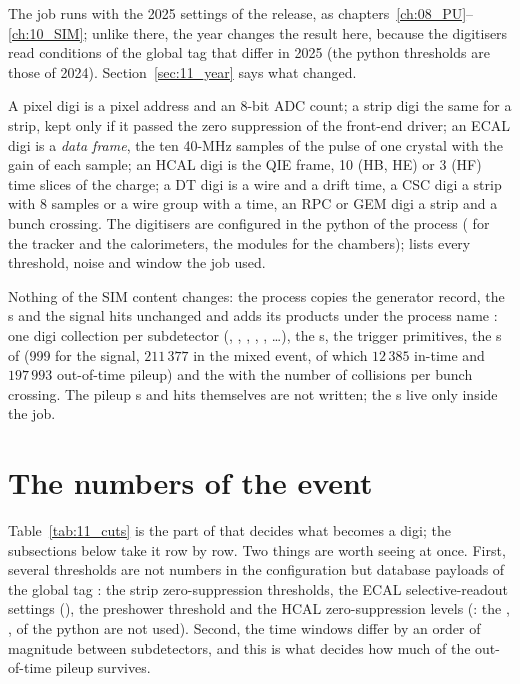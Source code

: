 The job runs with the 2025 settings of the release, as chapters~\ref{ch:08_PU}--\ref{ch:10_SIM}; unlike there, the
year changes the result here, because the digitisers read conditions of the global tag that differ in 2025 (the
python thresholds are those of 2024). Section~\ref{sec:11_year} says what changed.

\begin{plainwords}
A pixel digi is a pixel address and an 8-bit ADC count; a strip digi the same for a strip, kept only if it passed the
zero suppression of the front-end driver; an ECAL digi is a \emph{data frame}, the ten 40-MHz samples of the pulse of
one crystal with the gain of each sample; an HCAL digi is the QIE frame, 10 (HB, HE) or 3 (HF) time slices of the
charge; a DT digi is a wire and a drift time, a CSC digi a strip with 8 samples or a wire group with a time, an RPC
or GEM digi a strip and a bunch crossing. The digitisers are configured in the python of the  process
( for the tracker and the calorimeters, the modules  for the
chambers);  lists every threshold, noise and window the job used.
\end{plainwords}

Nothing of the SIM content changes: the  process copies the generator record, the s and
the signal hits unchanged and adds its products under the process name : one digi collection per
subdetector (, , , ,
, \ldots), the s, the trigger primitives, the s of
 (999 for the signal, $211\,377$ in the mixed event, of which $12\,385$ in-time and
$197\,993$ out-of-time pileup) and the  with the number of collisions per bunch crossing. The
pileup s and hits themselves are not written; the s live only inside the job.

\section{The numbers of the event}
\label{sec:11_numbers}

Table~\ref{tab:11_cuts} is the part of  that decides what becomes a digi; the
subsections below take it row by row. Two things are worth seeing at once. First, several thresholds are not numbers
in the configuration but database payloads of the global tag : the strip
zero-suppression thresholds, the ECAL selective-readout settings (), the preshower
threshold and the HCAL zero-suppression levels (: the , ,  of the python are not used). Second, the time windows differ by an order of magnitude between
subdetectors, and this is what decides how much of the out-of-time pileup survives.

